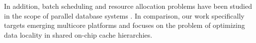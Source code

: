 In addition, batch scheduling and resource allocation problems have been studied in the scope of parallel database systems \cite{Yu:1986,Mehta:1993}. In comparison, our work specifically targets emerging multicore platforms and focuses on the problem of optimizing data locality in shared on-chip cache hierarchies.



